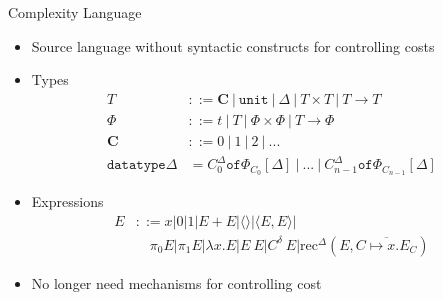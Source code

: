\documentclass[pdf]{beamer}
\newcommand{\T}[1]{\texttt{#1}}
\newcommand{\LP}{\langle}
\newcommand{\RP}{\rangle}
\begin{document}
\begin{frame}{Complexity Language}
  \begin{itemize}
    \item Source language without syntactic constructs for controlling costs
    \item Types
      \begin{align*}
        T &::= \textbf{C} \ |\ \T{unit} \ |\ \Delta \ |\ T \times T \ |\ T \rightarrow T \\
        \Phi &::= t \ |\ T \ |\ \Phi \times \Phi \ |\ T \rightarrow \Phi \\
        \textbf{C} &::= 0\ |\ 1\ |\ 2\ |\ ... \\
        \T{datatype}\Delta &= C^\Delta_0 \T{of} \Phi_{C_0}[\Delta] \ |\ ... \ |\ C^\Delta_{n-1} \T{of} \Phi_{C_{n-1}}[\Delta]
      \end{align*}
    \item Expressions
      \begin{align*}
        E &::= x | 0 | 1 | E + E | \LP\RP | \LP E,E \RP | \\
          &\quad \pi_0 E | \pi_1 E | \lambda x.E | E\ E | C^\delta\ E | \text{rec}^\Delta(E, \overline{C \mapsto x.E_C})
      \end{align*}
    \vfill
    \item No longer need mechanisms for controlling cost
  \end{itemize}

\end{frame}
\end{document}

